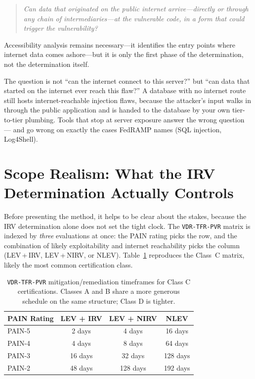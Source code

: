 \documentclass[11pt]{article}
\newcommand{\code}[1]{\texttt{#1}}
\begin{document}
\begin{quote}
\emph{Can data that originated on the public internet arrive---directly or through any chain of intermediaries---at the vulnerable code, in a form that could trigger the vulnerability?}
\end{quote}

Accessibility analysis remains necessary---it identifies the entry points where internet data comes ashore---but it is only the first phase of the determination, not the determination itself.

\begin{plain}
The question is not ``can the internet connect to this server?'' but ``can data that started on the internet ever reach this flaw?'' A database with no internet route still hosts internet-reachable injection flaws, because the attacker's input walks in through the public application and is handed to the database by your own tier-to-tier plumbing. Tools that stop at server exposure answer the wrong question --- and go wrong on exactly the cases FedRAMP names (SQL injection, Log4Shell).
\end{plain}

\section{Scope Realism: What the IRV Determination Actually Controls}
\label{sec:scope}
Before presenting the method, it helps to be clear about the stakes, because the IRV determination alone does not set the tight clock. The \code{VDR-TFR-PVR} matrix is indexed by \emph{three} evaluations at once: the PAIN rating picks the row, and the combination of likely exploitability and internet reachability picks the column (LEV\,+\,IRV, LEV\,+\,NIRV, or NLEV). Table~\ref{tab:pain} reproduces the Class~C matrix, likely the most common certification class.

\begin{table}[H]
\centering
\begin{tabular}{lccc}
\toprule
\textbf{PAIN Rating} & \textbf{LEV + IRV} & \textbf{LEV + NIRV} & \textbf{NLEV} \\
\midrule
PAIN-5 & 2 days & 4 days & 16 days \\
PAIN-4 & 4 days & 8 days & 64 days \\
PAIN-3 & 16 days & 32 days & 128 days \\
PAIN-2 & 48 days & 128 days & 192 days \\
\bottomrule
\end{tabular}
\caption{\code{VDR-TFR-PVR} mitigation/remediation timeframes for Class C certifications. Classes A and B share a more generous schedule on the same structure; Class D is tighter.}
\label{tab:pain}
\end{table}
\end{document}
